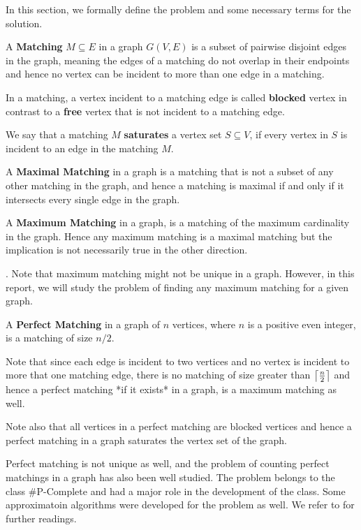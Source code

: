 In this section, we formally define the problem and some necessary terms for the solution.

\begin{definition}
A \textbf{Matching} $M \subseteq E$ in a graph $G(V, E)$ is a subset of pairwise disjoint edges in the graph, meaning the edges of a matching do not overlap in their endpoints and hence no vertex can be incident to more than one edge in a matching.
\end{definition}
In a matching, a vertex incident to a matching edge is called \textbf{blocked} vertex in contrast to a \textbf{free} vertex that is not incident to a matching edge.

We say that a matching $M$ \textbf{saturates} a vertex set $S \subseteq V$, if every vertex in $S$ is incident to an edge in the matching $M$.

\begin{definition}
A \textbf{Maximal Matching} in a graph is a matching that is not a subset of any other matching in the graph, and hence a matching is maximal if and only if it intersects every single edge in the graph.
\end{definition}

\begin{definition}
A \textbf{Maximum Matching} in a graph, is a matching of the maximum cardinality in the graph. Hence any maximum matching is a maximal matching but the implication is not necessarily true in the other direction.
\end{definition}.
Note that maximum matching might not be unique in a graph. However, in this report, we will study the problem of finding any maximum matching for a given graph.

\begin{definition}
A \textbf{Perfect Matching} in a graph of $n$ vertices, where $n$ is a positive even integer, is a matching of size $n/2$.
\end{definition}
Note that since each edge is incident to two vertices and no vertex is incident to more that one matching edge, there is no matching of size greater than $\ceil*{ \frac{n}{2}}$ and hence a perfect matching *if it exists* in a graph, is a maximum matching as well.

Note also that all vertices in a perfect matching are blocked vertices and hence a perfect matching in a graph saturates the vertex set of the graph.

Perfect matching is not unique as well, and the problem of counting perfect matchings in a graph has also been well studied. The problem belongs to the class \#P-Complete and had a major role in the development of the class. Some approximatoin algorithms were developed for the problem as well. We refer to \cite{vstefankovivc2018counting} for further readings.

